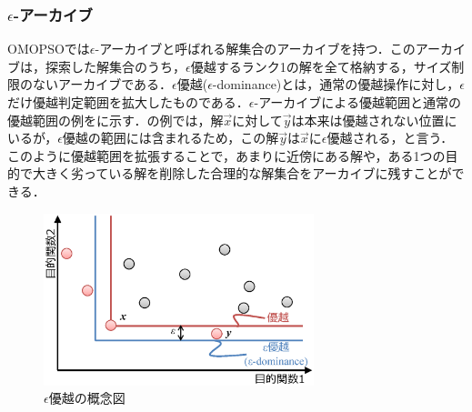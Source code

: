 \subsubsection{$\epsilon$-アーカイブ}
OMOPSOでは$\epsilon$-アーカイブと呼ばれる解集合のアーカイブを持つ．このアーカイブは，探索した解集合のうち，$\epsilon$優越するランク1の解を全て格納する，サイズ制限のないアーカイブである．$\epsilon$優越($\epsilon$-dominance)とは，通常の優越操作に対し，$\epsilon$だけ優越判定範囲を拡大したものである．$\epsilon$-アーカイブによる優越範囲と通常の優越範囲の例をに示す．の例では，解$\vec{x}$に対して$\vec{y}$は本来は優越されない位置にいるが，$\epsilon$優越の範囲には含まれるため，この解$\vec{y}$は$\vec{x}$に$\epsilon$優越される，と言う．このように優越範囲を拡張することで，あまりに近傍にある解や，ある1つの目的で大きく劣っている解を削除した合理的な解集合をアーカイブに残すことができる．

\begin{figure}[ht]
    \begin{center}
        \includegraphics[width=0.7\textwidth,keepaspectratio=true]{fig/theory_epsilon_dominance.eps}
    \end{center}
    \caption{$\epsilon$優越の概念図}
    \label{fig::theory_epsilon_dominance}
\end{figure}


